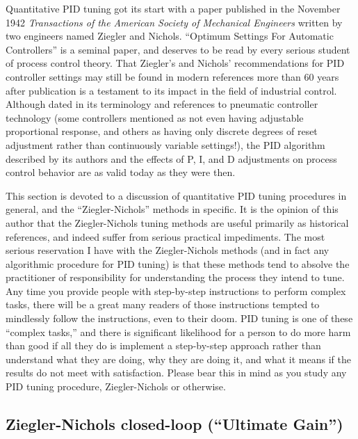 \vskip 10pt

Quantitative PID tuning got its start with a paper published in the November 1942 \textit{Transactions of the American Society of Mechanical Engineers} written by two engineers named Ziegler and Nichols.  ``Optimum Settings For Automatic Controllers'' is a seminal paper, and deserves to be read by every serious student of process control theory.  That Ziegler's and Nichols' recommendations for PID controller settings may still be found in modern references more than 60 years after publication is a testament to its impact in the field of industrial control.  Although dated in its terminology and references to pneumatic controller technology (some controllers mentioned as not even having adjustable proportional response, and others as having only discrete degrees of reset adjustment rather than continuously variable settings!), the PID algorithm described by its authors and the effects of P, I, and D adjustments on process control behavior are as valid today as they were then.    

This section is devoted to a discussion of quantitative PID tuning procedures in general, and the ``Ziegler-Nichols'' methods in specific.  It is the opinion of this author that the Ziegler-Nichols tuning methods are useful primarily as historical references, and indeed suffer from serious practical impediments.  The most serious reservation I have with the Ziegler-Nichols methods (and in fact any algorithmic procedure for PID tuning) is that these methods tend to absolve the practitioner of responsibility for understanding the process they intend to tune.  Any time you provide people with step-by-step instructions to perform complex tasks, there will be a great many readers of those instructions tempted to mindlessly follow the instructions, even to their doom.  PID tuning is one of these ``complex tasks,'' and there is significant likelihood for a person to do more harm than good if all they do is implement a step-by-step approach rather than understand what they are doing, why they are doing it, and what it means if the results do not meet with satisfaction.  Please bear this in mind as you study any PID tuning procedure, Ziegler-Nichols or otherwise.






\filbreak
\subsection{Ziegler-Nichols closed-loop (``Ultimate Gain'')}

